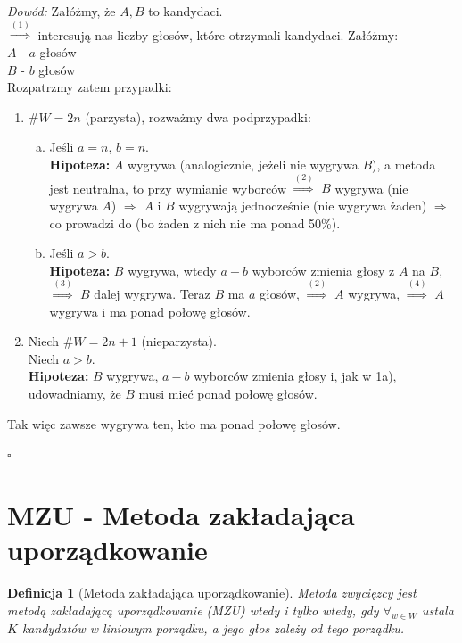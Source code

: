 \documentclass[12pt,a4paper]{article}
\theoremstyle{break}
\newtheorem{definition}{Definicja}[section]
\begin{document}
	\textit{Dowód:}
	Załóżmy, że $A,B$ to kandydaci.\\
	$\overset{(1)}{\Rightarrow}$ interesują nas liczby głosów, które otrzymali kandydaci. Załóżmy:\\
	$A$ - $a$ głosów\\
	$B$ - $b$ głosów\\
	Rozpatrzmy zatem przypadki:\\
	\begin{enumerate}[1$^\circ$]
		\item $\# W = 2n$ (parzysta), rozważmy dwa podprzypadki:
		\begin{enumerate}[a)]
			\item Jeśli $a=n$, $b=n$.\\
			\textbf{Hipoteza:} $A$ wygrywa (analogicznie, jeżeli nie wygrywa $B$), a metoda jest neutralna, to przy wymianie wyborców $\overset{(2)}{\Rightarrow}$ $B$ wygrywa (nie wygrywa $A$) $\Rightarrow$ $A$ i $B$ wygrywają jednocześnie (nie wygrywa żaden) $\Rightarrow$ co prowadzi do \faBolt (bo żaden z nich nie ma ponad 50\%).
			
			\item Jeśli $a>b$.\\
			\textbf{Hipoteza:} $B$ wygrywa, wtedy $a-b$ wyborców zmienia głosy z $A$ na $B$, $\overset{(3)}{\Rightarrow}$ $B$ dalej wygrywa. Teraz $B$ ma $a$ głosów, $\overset{(2)}{\Rightarrow}$ $A$ wygrywa, $\overset{(4)}{\Rightarrow}$ $A$ wygrywa i ma ponad połowę głosów.
		\end{enumerate}
		
		\item Niech $\# W = 2n+1$ (nieparzysta).\\
		Niech $a>b$.\\
		\textbf{Hipoteza:} $B$ wygrywa, $a-b$ wyborców zmienia głosy i, jak w 1a), udowadniamy, że $B$ musi mieć ponad połowę głosów.
	\end{enumerate}
	
	Tak więc zawsze wygrywa ten, kto ma ponad połowę głosów.
	\begin{flushright}$\square$\end{flushright}
	
	\newpage
	
	\section{MZU - Metoda zakładająca uporządkowanie}
	\begin{definition}[Metoda zakładająca uporządkowanie]
		Metoda zwycięzcy jest metodą zakładającą uporządkowanie (MZU) \textit{wtedy i tylko wtedy}, gdy $\forall_{w\in W}$ ustala $K$ kandydatów w liniowym porządku, a jego głos zależy od tego porządku.
	\end{definition}
	
\end{document}
